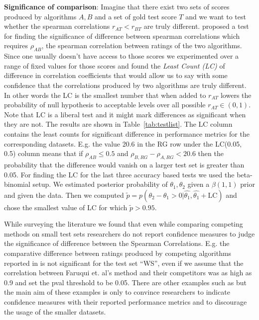 \documentclass[11pt]{article}
\begin{document}
\noindent\textbf{Significance of comparison}: Imagine that there exist
two sets of  scores produced by algorithms $A, B$ and a set of gold
test score $T$ and we want to test 
whether the spearman correlations $r_{AT} < r_{BT}$ are truly different.
 proposed a test for
finding the significance of difference between spearman correlations
which requires $\rho_{AB}$, the spearman correlation between ratings of the two
algorithms. Since one usually doesn't have access to 
those scores  we experimented over a range of fixed values for those
scores and found the \emph{Least Count (LC)} of difference in correlation
coefficients that would allow us to say with 
some confidence that the correlations produced by two algorithms are
truly different. In other words the LC is the smallest number that 
when added to $r_{AT}$ lowers the probability of null
hypothesis to acceptable levels over all possible $r_{AT} \in (0,
1)$. Note that LC is a liberal test and it 
might mark differences as significant when they are not. The results are shown in
Table~\ref{tab:testlist}. The LC column contains the
least counts for significant difference in performance metrics for
the corresponding datasets. E.g. the value 20.6 in the RG row under the
LC(0.05, 0.5) column means that if $\rho_{AB} \le 0.5$ and
$\rho_{B,RG} - \rho_{A,RG} < 20.6$ then the probability that the
difference would vanish on a larger test set is greater than 0.05.
For finding the LC for the last three accuracy based tests we
used the beta-binomial setup.  We estimated posterior
probability of $\theta_1, \theta_2$ given a $\beta(1,1)$ prior and
given the data. Then we computed $\tilde{p} = p(\theta_2 - \theta_1 >
0 | \hat{\theta_1}, \hat{\theta_1} + \textrm{LC})$ and chose
the smallest value of LC for which $\tilde{p} > 0.95$.

While surveying the literature we found that even while comparing
competing methods on small test sets researchers do not report
confidence  measures to judge the significance of difference between
the Spearman Correlations. 
E.g. the comparative difference between ratings produced by competing
algorithms reported in \cite{faruqui2014retrofitting}  
is not significant for the test set ``WS'', even if we assume that the correlation between Faruqui
et. al's method and their competitors was as high as 0.9 and set the
pval threshold to be 0.05. There are other examples such as
\cite{hill2014not} but the main aim of these examples is only to
convince researchers to  indicate confidence measures with their reported 
performance metrics and to discourage the usage of the smaller datasets.
\end{document}

